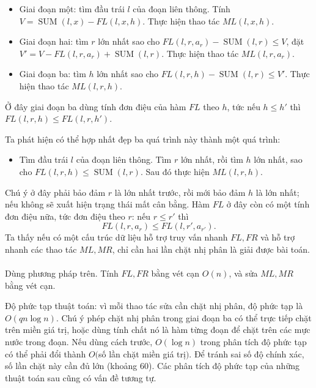 \documentclass[11pt]{article}
\DeclareMathOperator{\SUM}{SUM}
\begin{document}
\begin{itemize}
  \item Giai đoạn một: tìm đầu trái \(l\) của đoạn liên thông. Tính
        \(V=\SUM(l,x)-FL(l,x,h)\). Thực hiện thao tác \(ML(l,x,h)\).
  \item Giai đoạn hai: tìm \(r\) lớn nhất sao cho
        \(FL(l,r,a_r)-\SUM(l,r)\le V\), đặt
        \(V'=V-FL(l,r,a_r)+\SUM(l,r)\). Thực hiện thao tác \(ML(l,r,a_r)\).
  \item Giai đoạn ba: tìm \(h\) lớn nhất sao cho
        \(FL(l,r,h)-\SUM(l,r)\le V'\). Thực hiện thao tác \(ML(l,r,h)\).
\end{itemize}

Ở đây giai đoạn ba dùng tính đơn điệu của hàm \(FL\) theo \(h\), tức nếu
\(h\le h'\) thì \(FL(l,r,h)\le FL(l,r,h')\).

Ta phát hiện có thể hợp nhất đẹp ba quá trình này thành một quá trình:

\begin{itemize}
  \item Tìm đầu trái \(l\) của đoạn liên thông. Tìm \(r\) lớn nhất, rồi tìm
        \(h\) lớn nhất, sao cho \(FL(l,r,h)\le \SUM(l,r)\). Sau đó thực hiện
        \(ML(l,r,h)\).
\end{itemize}

Chú ý ở đây phải bảo đảm \(r\) là lớn nhất trước, rồi mới bảo đảm \(h\) là lớn
nhất; nếu không sẽ xuất hiện trạng thái mất cân bằng. Hàm \(FL\) ở đây còn có
một tính đơn điệu nữa, tức đơn điệu theo \(r\): nếu \(r\le r'\) thì
\[
  FL(l,r,a_r)\le FL(l,r',a_{r'}).
\]
Ta thấy nếu có một cấu trúc dữ liệu hỗ trợ truy vấn nhanh \(FL,FR\) và hỗ trợ
nhanh các thao tác \(ML,MR\), chỉ cần hai lần chặt nhị phân là giải được bài
toán.

\paragraph{}
Dùng phương pháp trên. Tính \(FL,FR\) bằng vét cạn \(O(n)\), và sửa
\(ML,MR\) bằng vét cạn.

Độ phức tạp thuật toán: vì mỗi thao tác sửa cần chặt nhị phân, độ phức tạp là
\(O(qn\log n)\). Chú ý phép chặt nhị phân trong giai đoạn ba có thể trực tiếp
chặt trên miền giá trị, hoặc dùng tính chất nó là hàm từng đoạn để chặt trên
các mực nước trong đoạn. Nếu dùng cách trước, \(O(\log n)\) trong phân tích độ
phức tạp có thể phải đổi thành \(O(\)số lần chặt miền giá trị\()\). Để tránh
sai số độ chính xác, số lần chặt này cần đủ lớn (khoảng 60). Các phân tích độ
phức tạp của những thuật toán sau cũng có vấn đề tương tự.
\end{document}
